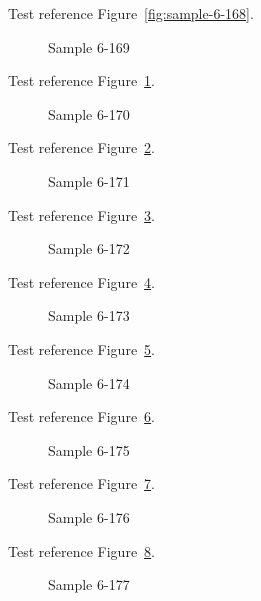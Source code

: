 Test reference Figure~\ref{fig:sample-6-168}.

\begin{figure}[tbhp]
\caption{Sample 6-169}
\label{fig:sample-6-169}
\end{figure}

Test reference Figure~\ref{fig:sample-6-169}.

\begin{figure}[tbhp]
\caption{Sample 6-170}
\label{fig:sample-6-170}
\end{figure}

Test reference Figure~\ref{fig:sample-6-170}.

\begin{figure}[tbhp]
\caption{Sample 6-171}
\label{fig:sample-6-171}
\end{figure}

Test reference Figure~\ref{fig:sample-6-171}.

\begin{figure}[tbhp]
\caption{Sample 6-172}
\label{fig:sample-6-172}
\end{figure}

Test reference Figure~\ref{fig:sample-6-172}.

\begin{figure}[tbhp]
\caption{Sample 6-173}
\label{fig:sample-6-173}
\end{figure}

Test reference Figure~\ref{fig:sample-6-173}.

\begin{figure}[tbhp]
\caption{Sample 6-174}
\label{fig:sample-6-174}
\end{figure}

Test reference Figure~\ref{fig:sample-6-174}.

\begin{figure}[tbhp]
\caption{Sample 6-175}
\label{fig:sample-6-175}
\end{figure}

Test reference Figure~\ref{fig:sample-6-175}.

\begin{figure}[tbhp]
\caption{Sample 6-176}
\label{fig:sample-6-176}
\end{figure}

Test reference Figure~\ref{fig:sample-6-176}.

\begin{figure}[tbhp]
\caption{Sample 6-177}
\label{fig:sample-6-177}
\end{figure}

